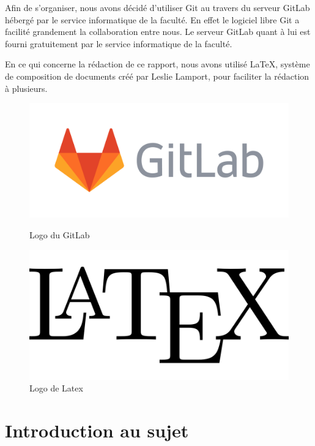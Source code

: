 \documentclass[oneside,13pt,a4paper]{report}
\begin{document}
Afin de s'organiser, nous avons décidé d'utiliser Git au travers du serveur GitLab hébergé par le service informatique de la faculté. En effet le logiciel libre Git a facilité grandement la collaboration entre nous. Le serveur GitLab quant à lui est fourni gratuitement par le service informatique de la faculté.

En ce qui concerne la rédaction de ce rapport, nous avons utilisé \LaTeX, système de composition de documents créé par Leslie Lamport, pour faciliter la rédaction à plusieurs.

\begin{figure}[h]
	\begin{minipage}[c]{.46\linewidth}
		\centering
		\includegraphics[width=1\textwidth]{img/gitlab.png}
		\caption{Logo du GitLab}
	\end{minipage}
	\hfill%
	\begin{minipage}[c]{.46\linewidth}
		\centering
		\includegraphics[width=1\textwidth]{img/latex.png}
		\caption{Logo de Latex}
	\end{minipage}
\end{figure}



\chapter{Introduction au sujet}
\end{document}
